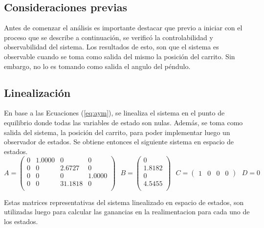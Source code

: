 %
%
%

\subsection{Consideraciones previas}
Antes de comenzar el análisis es importante destacar que previo a iniciar con el proceso que se describe a continuación, se verificó la controlabilidad y observabilidad del sistema. Los resultados de esto, son que el sistema es observable cuando se toma como salida del mismo la posición del carrito. Sin embargo, no lo es tomando como salida el angulo del péndulo.

\subsection{Linealización}
En base a las Ecuaciones (\ref{eq:aym}), se linealiza el sistema en el punto de equilibrio donde todas las variables de estado son nulas. Además, se toma como salida del sistema, la posición del carrito, para poder implementar luego un observador de estados.
Se obtiene entonces el siguiente sistema en espacio de estados.
\begin{equation}
A=
	\begin{pmatrix}
		0   & 1.0000  &       0   &      0\\
         0  &       0  &  2.6727   &      0\\
         0     &   0      &   0  &  1.0000\\
         0    &     0  & 31.1818      &   0\\
	\end{pmatrix} \ \ \
B=
	\begin{pmatrix}
		 0\\
    1.8182\\
         0\\
    4.5455\\

	\end{pmatrix} \ \ \
C=
\begin{pmatrix}
		1&0&0&0

	\end{pmatrix} \ \ \
D=0
\end{equation}

Estas matrices representativas del sistema linealizado en espacio de estados, son utilizadas luego para calcular las ganancias en la realimentacion para cada uno de los estados.

